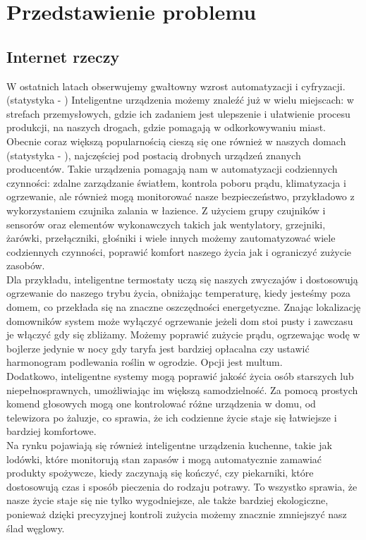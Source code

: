 \section{Przedstawienie problemu}

\subsection{Internet rzeczy}
W ostatnich latach obserwujemy gwałtowny wzrost automatyzacji i cyfryzacji. (statystyka - \cite{statistaconnecteddevices}) Inteligentne urządzenia możemy znaleźć już w wielu miejscach: w strefach przemysłowych, gdzie ich zadaniem jest ulepszenie i ułatwienie procesu produkcji, na naszych drogach, gdzie pomagają w odkorkowywaniu miast. Obecnie coraz większą popularnością cieszą się one również w naszych domach (statystyka - \cite{iotstatistasmarthome}), najczęściej pod postacią drobnych urządzeń znanych producentów. Takie urządzenia pomagają nam w automatyzacji codziennych czynności: zdalne zarządzanie światłem, kontrola poboru prądu, klimatyzacja i ogrzewanie, ale również mogą monitorować nasze bezpieczeństwo, przykładowo z wykorzystaniem czujnika zalania w łazience. Z użyciem grupy czujników i sensorów oraz elementów wykonawczych takich jak wentylatory, grzejniki, żarówki, przełączniki, głośniki i wiele innych możemy zautomatyzować wiele codziennych czynności, poprawić komfort naszego życia jak i ograniczyć zużycie zasobów.\\

Dla przykładu, inteligentne termostaty uczą się naszych zwyczajów i dostosowują ogrzewanie do naszego trybu życia, obniżając temperaturę, kiedy jesteśmy poza domem, co przekłada się na znaczne oszczędności energetyczne. Znając lokalizację domowników system może wyłączyć ogrzewanie jeżeli dom stoi pusty i zawczasu je włączyć gdy się zbliżamy. Możemy poprawić zużycie prądu, ogrzewając wodę w bojlerze jedynie w nocy gdy taryfa jest bardziej opłacalna czy ustawić harmonogram podlewania roślin w ogrodzie. Opcji jest multum.\\

Dodatkowo, inteligentne systemy mogą poprawić jakość życia osób starszych lub niepełnosprawnych, umożliwiając im większą samodzielność. Za pomocą prostych komend głosowych mogą one kontrolować różne urządzenia w domu, od telewizora po żaluzje, co sprawia, że ich codzienne życie staje się łatwiejsze i bardziej komfortowe.\\

Na rynku pojawiają się również inteligentne urządzenia kuchenne, takie jak lodówki, które monitorują stan zapasów i mogą automatycznie zamawiać produkty spożywcze, kiedy zaczynają się kończyć, czy piekarniki, które dostosowują czas i sposób pieczenia do rodzaju potrawy. To wszystko sprawia, że nasze życie staje się nie tylko wygodniejsze, ale także bardziej ekologiczne, ponieważ dzięki precyzyjnej kontroli zużycia możemy znacznie zmniejszyć nasz ślad węglowy.\\

